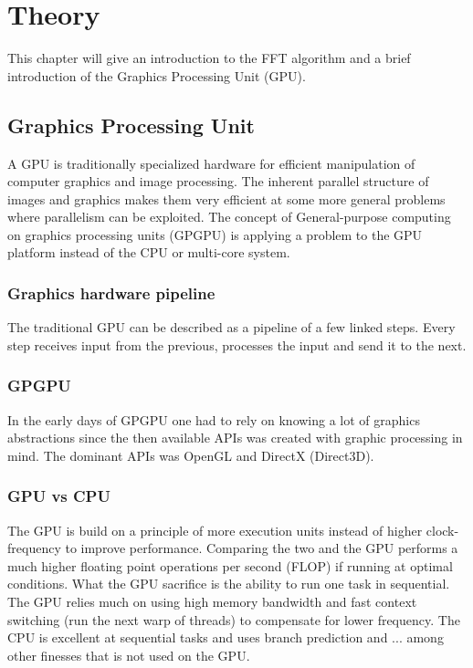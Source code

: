 \chapter{Theory}

This chapter will give an introduction to the FFT algorithm and a brief introduction of the Graphics Processing Unit (GPU).

\section{Graphics Processing Unit}

A GPU is traditionally specialized hardware for efficient manipulation of computer graphics and image processing. The inherent parallel structure of images and graphics makes them very efficient at some more general problems where parallelism can be exploited. The concept of General-purpose computing on graphics processing units (GPGPU) is applying a problem to the GPU platform instead of the CPU or multi-core system.

\subsection{Graphics hardware pipeline}

The traditional GPU can be described as a pipeline of a few linked steps. Every step receives input from the previous, processes the input and send it to the next. 

\subsection{GPGPU}

In the early days of GPGPU one had to rely on knowing a lot of graphics abstractions since the then available APIs was created with graphic processing in mind. The dominant APIs was OpenGL and DirectX (Direct3D).

\subsection{GPU vs CPU}

The GPU is build on a principle of more execution units instead of higher clock-frequency to improve performance. Comparing the two and the GPU performs a much higher floating point operations per second (FLOP) if running at optimal conditions. What the GPU sacrifice is the ability to run one task in sequential. The GPU relies much on using high memory bandwidth and fast context switching (run the next warp of threads) to compensate for lower frequency. The CPU is excellent at sequential tasks and uses branch prediction and ... among other finesses that is not used on the GPU.

